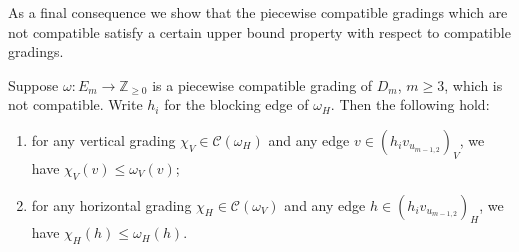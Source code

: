 \documentclass[ALCO,ThmDefs,Unicode,epreuves]{cedram}
\newcommand{\cC}{\mathcal{C}}
\newcommand{\ZZ}{\mathbb{Z}}
\begin{document}
As a final consequence we show that the piecewise compatible gradings which are not compatible satisfy a certain upper bound property with respect to compatible gradings.
\begin{corollary}
 \label{cor:maximality}
 Suppose $\omega:E_m\to\ZZ_{\ge0}$ is a piecewise compatible grading of $D_m$, $m\ge3$, which is not compatible.
 Write $h_i$ for the blocking edge of $\omega_H$.
 Then the following hold:
 \begin{enumerate}[label=(\alph*)]
 \item\label{coro3.24_1} for any vertical grading $\chi_V\in\cC(\omega_H)$ and any edge $v\in(h_iv_{u_{m-1,2}})_V$, we have $\chi_V(v)\le\omega_V(v)$;
 \item\label{coro3.24_2} for any horizontal grading $\chi_H\in\cC(\omega_V)$ and any edge $h\in(h_iv_{u_{m-1,2}})_H$, we have $\chi_H(h)\le\omega_H(h)$.
 \end{enumerate}
\end{corollary}
\end{document}
